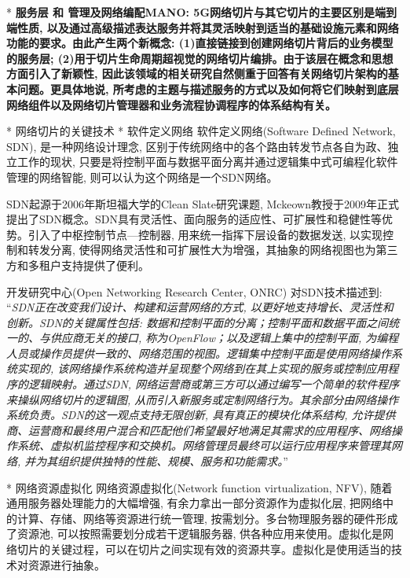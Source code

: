     * \bf{服务层 和 管理及网络编配MANO}: 5G网络切片与其它切片的主要区别是端到端性质, 以及通过高级描述表达服务并将其灵活映射到适当的基础设施元素和网络功能的要求。由此产生两个新概念: (1)直接链接到创建网络切片背后的业务模型的服务层; (2)用于切片生命周期超视觉的网络切片编排。由于该层在概念和思想方面引入了新颖性, 因此该领域的相关研究自然侧重于回答有关网络切片架构的基本问题。更具体地说, 所考虑的主题与描述服务的方式以及如何将它们映射到底层网络组件以及网络切片管理器和业务流程协调程序的体系结构有关。
    

    
* 网络切片的关键技术
    * 软件定义网络
        软件定义网络(Software Defined Network, SDN), 是一种网络设计理念, 区别于传统网络中的各个路由转发节点各自为政、独立工作的现状, 只要是将控制平面与数据平面分离并通过逻辑集中式可编程化软件管理的网络智能, 则可以认为这个网络是一个SDN网络。
        
        SDN起源于2006年斯坦福大学的Clean Slate研究课题, Mckeown教授于2009年正式提出了SDN概念。SDN具有灵活性、面向服务的适应性、可扩展性和稳健性等优势。引入了中枢控制节点---控制器, 用来统一指挥下层设备的数据发送, 以实现控制和转发分离, 使得网络灵活性和可扩展性大为增强，其抽象的网络视图也为第三方和多租户支持提供了便利。

        开发研究中心(Open Networking Research Center, ONRC) 对SDN技术描述到:  “\textit{SDN正在改变我们设计、构建和运营网络的方式, 以更好地支持增长、灵活性和创新。SDN的关键属性包括: 数据和控制平面的分离；控制平面和数据平面之间统一的、与供应商无关的接口, 称为OpenFlow；以及逻辑上集中的控制平面, 为编程人员或操作员提供一致的、网络范围的视图。逻辑集中控制平面是使用网络操作系统实现的, 该网络操作系统构造并呈现整个网络到在其上实现的服务或控制应用程序的逻辑映射。通过SDN, 网络运营商或第三方可以通过编写一个简单的软件程序来操纵网络切片的逻辑图, 从而引入新服务或定制网络行为。其余部分由网络操作系统负责。SDN的这一观点支持无限创新, 具有真正的模块化体系结构, 允许提供商、运营商和最终用户混合和匹配他们希望最好地满足其需求的应用程序、网络操作系统、虚拟机监控程序和交换机。网络管理员最终可以运行应用程序来管理其网络, 并为其组织提供独特的性能、规模、服务和功能需求。}”
    
    * 网络资源虚拟化
        网络资源虚拟化(Network function virtualization, NFV), 随着通用服务器处理能力的大幅增强, 有余力拿出一部分资源作为虚拟化层, 把网络中的计算、存储、网络等资源进行统一管理, 按需划分。多台物理服务器的硬件形成了资源池, 可以按照需要划分成若干逻辑服务器, 供各种应用来使用。虚拟化是网络切片的关键过程，可以在切片之间实现有效的资源共享。虚拟化是使用适当的技术对资源进行抽象。

